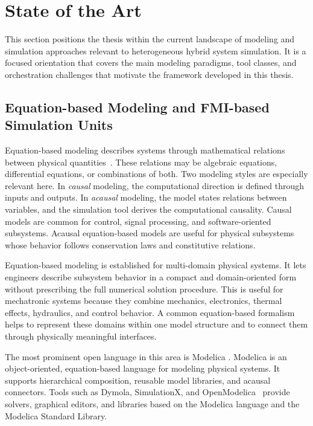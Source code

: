 \section{State of the Art}
\label{sec:intro_sota}

This section positions the thesis within the current landscape of modeling and simulation approaches relevant to heterogeneous hybrid system simulation.
It is a focused orientation that covers the main modeling paradigms, tool classes, and orchestration challenges that motivate the framework developed in this thesis.

\subsection{Equation-based Modeling and FMI-based Simulation Units}

Equation-based modeling describes systems through mathematical relations between physical quantities~\cite{Modelica_Fritzson}.
These relations may be algebraic equations, differential equations, or combinations of both.
Two modeling styles are especially relevant here.
In \emph{causal} modeling, the computational direction is defined through inputs and outputs.
In \emph{acausal} modeling, the model states relations between variables, and the simulation tool derives the computational causality.
Causal models are common for control, signal processing, and software-oriented subsystems.
Acausal equation-based models are useful for physical subsystems whose behavior follows conservation laws and constitutive relations.

Equation-based modeling is established for multi-domain physical systems.
It lets engineers describe subsystem behavior in a compact and domain-oriented form without prescribing the full numerical solution procedure.
This is useful for mechatronic systems because they combine mechanics, electronics, thermal effects, hydraulics, and control behavior.
A common equation-based formalism helps to represent these domains within one model structure and to connect them through physically meaningful interfaces.

The most prominent open language in this area is Modelica \cite{Modelica_Fritzson}.
Modelica is an object-oriented, equation-based language for modeling physical systems.
It supports hierarchical composition, reusable model libraries, and acausal connectors.
Tools such as Dymola, SimulationX, and OpenModelica~\cite{fritzson_openmodelica_2020} provide solvers, graphical editors, and libraries based on the Modelica language and the Modelica Standard Library.

